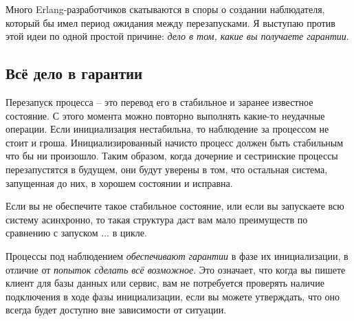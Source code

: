\documentclass[11pt, oneside]{book}   	%
\begin{document}
Много Erlang-разработчиков скатываются в споры о создании наблюдателя, который бы имел период ожидания между перезапусками. Я выступаю против этой идеи по одной простой причине: \emph{дело в том, какие вы получаете гарантии}.

\subsection{Всё дело в гарантии}
\label{subsec:start-link-guarantees}

Перезапуск процесса -- это перевод его в стабильное и заранее известное состояние. С этого момента можно повторно выполнять какие-то неудачные операции. Если инициализация нестабильна, то наблюдение за процессом не стоит и гроша. Инициализированный начисто процесс должен быть стабильным что бы ни произошло. Таким образом, когда дочерние и сестринские процессы перезапустятся в будущем, они будут уверены в том, что остальная система, запущенная до них, в хорошем состоянии и исправна.

Если вы не обеспечите такое стабильное состояние, или если вы запускаете всю систему асинхронно, то такая структура даст вам мало преимуществ по сравнению с запуском  ...  в цикле.

Процессы под наблюдением \emph{обеспечивают гарантии} в фазе их инициализации, в отличие от \emph{попыток сделать всё возможное}. Это означает, что когда вы пишете клиент для базы данных или сервис, вам не потребуется проверять наличие подключения в ходе фазы инициализации, если вы можете утверждать, что оно всегда будет доступно вне зависимости от ситуации.
\end{document}

